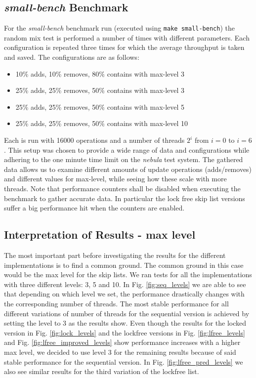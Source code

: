 \documentclass{article}
\begin{document}
\subsection{\emph{small-bench} Benchmark}
For the \emph{small-bench} benchmark run (executed using \texttt{make small-bench}) the random mix test is performed a number of times with different parameters.
Each configuration is repeated three times for which the average throughput is taken and saved.
The configurations are as follows:
\begin{itemize}
    \item 10\% adds, 10\% removes, 80\% contains with max-level 3
    \item 25\% adds, 25\% removes, 50\% contains with max-level 3
    \item 25\% adds, 25\% removes, 50\% contains with max-level 5
    \item 25\% adds, 25\% removes, 50\% contains with max-level 10
\end{itemize}
Each is run with 16000 operations and a number of threads $2^i$ from $i=0$ to $i=6$.
This setup was chosen to provide a wide range of data and configurations while adhering to the one minute time limit on the \emph{nebula} test system.
The gathered data allows us to examine different amounts of update operations (adds/removes) and different values for max-level, while seeing how these scale with more threads.
Note that performance counters shall be disabled when executing the benchmark to gather accurate data.
In particular the lock free skip list versions suffer a big performance hit when the counters are enabled.

\subsection{Interpretation of Results - max level}
The most important part before investigating the results for the different implementations is to find a common ground. The common ground in this case would be the max level for the skip lists. We ran tests for all the implementations with three different levels: 3, 5 and 10. In Fig. \ref{fig:seq_levels} we are able to see that depending on which level we set, the performance drastically changes with the corresponding number of threads. The most stable performance for all different variations of number of threads for the sequential version is achieved by setting the level to 3 as the results show. Even though the results for the locked version in Fig. \ref{fig:lock_levels} and the lockfree versions in Fig. \ref{fig:lfree_levels} and Fig. \ref{fig:lfree_improved_levels} show performance increases with a higher max level, we decided to use level 3 for the remaining results because of said stable performance for the sequential version. In Fig. \ref{fig:lfree_pred_levels} we also see similar results for the third variation of the lockfree list. 
\end{document}
